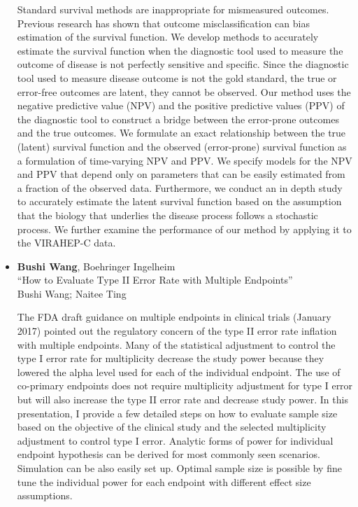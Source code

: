 \begin{itemize}
Standard survival methods are inappropriate for mismeasured outcomes. Previous research has shown that outcome misclassification can bias estimation of the survival function. We develop methods to accurately estimate the survival function when the diagnostic tool used to measure the outcome of disease is not perfectly sensitive and specific. Since the diagnostic tool used to measure disease outcome is not the gold standard, the true or error-free outcomes are latent, they cannot be observed. Our method uses the negative predictive value (NPV) and the positive predictive values (PPV) of the diagnostic tool to construct a bridge between the error-prone outcomes and the true
outcomes. We formulate an exact relationship between the true (latent) survival function and the observed (error-prone) survival function as a formulation of time-varying NPV and PPV. We specify models for the NPV and PPV that depend only on parameters that can be easily estimated from a fraction of the observed data. Furthermore, we conduct an in depth study to accurately estimate the latent survival function based on the assumption that the biology that underlies the disease process follows a stochastic process. We further examine the performance of our method by applying it to the VIRAHEP-C data.

\item \textbf{Bushi Wang}, Boehringer Ingelheim \\
``How to Evaluate Type II Error Rate with Multiple Endpoints'' \\
Bushi Wang; Naitee Ting


The FDA draft guidance on multiple endpoints in clinical trials (January 2017) pointed out the regulatory concern of the type II error rate inflation with multiple endpoints. Many of the statistical adjustment to control the type I error rate for multiplicity decrease the study power because they lowered the alpha level used for each of the individual endpoint. The use of co-primary endpoints does not require multiplicity adjustment for type I error but will also increase the type II error rate and decrease study power. In this presentation, I provide a few detailed steps on how to evaluate sample size based on the objective of the clinical study and the selected multiplicity adjustment to control type I error. Analytic forms of power for individual endpoint hypothesis can be derived for most commonly seen scenarios. Simulation can be also easily set up. Optimal sample size is possible by fine tune the individual power for each endpoint with different effect size assumptions.

\end{itemize}

